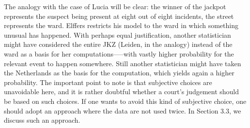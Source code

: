 \documentclass[letterpaper, landscape]{exam}
\begin{document}
  The analogy with the case of Lucia will be clear: the winner of the jackpot
  represents the suspect being present at eight out of eight incidents, the
  street represents the ward. Elffers restricts his model to the ward in which
  something unusual has happened. With perhaps equal justification, another
  statistician might have considered the entire JKZ (Leiden, in the analogy)
  instead of the ward as a basis for her computations--—with vastly higher
  probability for the relevant event to happen somewhere. Still another
  statistician might have taken the Netherlands as the basis for the
  computation, which yields again a higher probability. The important point to
  note is that subjective choices are unavoidable here, and it is rather
  doubtful whether a court’s judgement should be based on such choices. If one
  wants to avoid this kind of subjective choice, one should adopt an approach
  where the data are not used twice. In Section 3.3, we discuss such an
  approach.
\end{document}

